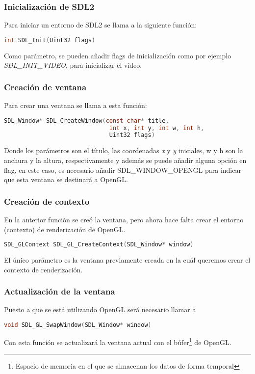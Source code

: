 \subsubsection{Inicialización de SDL2}
Para iniciar un entorno de SDL2 se llama a la siguiente función:
\begin{lstlisting}[language=C]
  int SDL_Init(Uint32 flags)
\end{lstlisting}
Como parámetro, se pueden añadir flags de inicialización como por ejemplo
\textit{SDL\_INIT\_VIDEO}, para inicializar el vídeo.

\subsubsection{Creación de ventana}
Para crear una ventana se llama a esta función:
\begin{lstlisting}[language=C]
  SDL_Window* SDL_CreateWindow(const char* title,
                              int x, int y, int w, int h, 
                              Uint32 flags)
\end{lstlisting}
Donde los parámetros son el título, las coordenadas \textit{x} y \textit{y} iniciales, w y h son la anchura y la altura, respectivamente y además se puede añadir alguna opción en flag, en este caso, es necesario añadir SDL\_WINDOW\_OPENGL para indicar que esta ventana se destinará a OpenGL.

\subsubsection{Creación de contexto}
En la anterior función se creó la ventana, pero ahora hace falta crear el entorno (contexto) de renderización de OpenGL.
\begin{lstlisting}[language=C]
  SDL_GLContext SDL_GL_CreateContext(SDL_Window* window)
\end{lstlisting}
El único parámetro es la ventana previamente creada en la cuál queremos crear el contexto de renderización.

\subsubsection{Actualización de la ventana}
Puesto a que se está utilizando OpenGL será necesario llamar a
\begin{lstlisting}[language=C]
  void SDL_GL_SwapWindow(SDL_Window* window)
\end{lstlisting}
Con esta función se actualizará la ventana actual con el búfer\footnote{Espacio de memoria en el que se almacenan los datos de forma temporal} de OpenGL.

